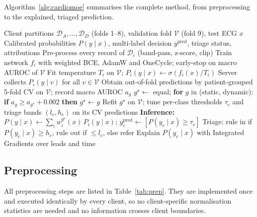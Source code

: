Algorithm~\ref{alg:cardiomoe} summarises the complete method, from preprocessing to the explained,
triaged prediction.

\begin{algorithm}[!t]
\caption{CardioSentinel: one-shot federated classification of 12-lead ECGs}
\label{alg:cardiomoe}
\footnotesize
\begin{algorithmic}[1]
\Require Client partitions $\mathcal{D}_A,\dots,\mathcal{D}_D$ (folds 1--8), validation fold $\mathcal{V}$ (fold 9), test ECG $x$
\Ensure Calibrated probabilities $P(y\mid x)$, multi-label decision $y^{\mathrm{pred}}$, triage status, attributions
 
  \State Pre-process every record of $\mathcal{D}_i$ (band-pass, z-score, clip)
  \State Train network $f_i$ with weighted BCE, AdamW and OneCycle; early-stop on macro AUROC of $\mathcal{V}$
  \State Fit temperature $T_i$ on $\mathcal{V}$; $P_i(y\mid x)\gets\sigma(f_i(x)/T_i)$
\EndFor
\State Server collects $P_i(y\mid v)$ for all $v\in\mathcal{V}$ 
  \State Obtain out-of-fold predictions by patient-grouped 5-fold CV on $\mathcal{V}$; record macro AUROC $a_g$
\EndFor
\State $g^\star\gets$ equal; \textbf{for} $g$ in (static, dynamic): \textbf{if} $a_g\ge a_{g^\star}+0.002$ \textbf{then} $g^\star\gets g$
\State Refit $g^\star$ on $\mathcal{V}$; tune per-class thresholds $\tau_c$ and triage bands $(l_c,h_c)$ on its CV predictions
\State \textbf{Inference:} $P(y\mid x)\gets\sum_i w_i^{g^\star}(x)\,P_i(y\mid x)$; $y^{\mathrm{pred}}_c\gets[P(y_c\mid x)\ge\tau_c]$
\State Triage: rule in if $P(y_c\mid x)\ge h_c$, rule out if $\le l_c$, else refer
\State Explain $P(y_c\mid x)$ with Integrated Gradients over leads and time
\end{algorithmic}
\end{algorithm}

\subsection{Preprocessing}
\label{sec:prep}

All preprocessing steps are listed in Table~\ref{tab:prep}. They are implemented once and executed
identically by every client, so no client-specific normalisation statistics are needed and no
information crosses client boundaries.


